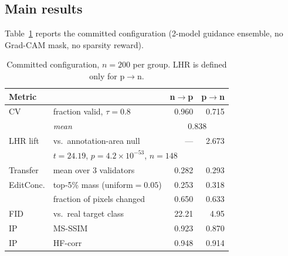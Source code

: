 \documentclass[10pt,twocolumn,letterpaper]{article}
\begin{document}
\subsection{Main results}
Table~\ref{tab:main} reports the committed configuration (2-model
guidance ensemble, no Grad-CAM mask, no sparsity reward).

\begin{table}[t]
\centering
\small
\caption{Committed configuration, $n=200$ per group. LHR is defined only
for p$\to$n.}
\label{tab:main}
\begin{tabular}{@{}llrr@{}}
\toprule
\textbf{Metric} & & \textbf{n$\to$p} & \textbf{p$\to$n} \\
\midrule
CV & fraction valid, $\tau{=}0.8$ & 0.960 & 0.715 \\
   & \emph{mean} & \multicolumn{2}{c}{0.838} \\
LHR lift & vs.\ annotation-area null & --- & 2.673 \\
   & \multicolumn{3}{l}{\footnotesize $t{=}24.19$, $p{=}4.2\times10^{-53}$, $n{=}148$} \\
Transfer & mean over 3 validators & 0.282 & 0.293 \\
EditConc. & top-5\% mass (uniform${=}0.05$) & 0.253 & 0.318 \\
   & fraction of pixels changed & 0.650 & 0.633 \\
FID & vs.\ real target class & 22.21 & 4.95 \\
IP & MS-SSIM & 0.923 & 0.870 \\
IP & HF-corr & 0.948 & 0.914 \\
\bottomrule
\end{tabular}
\end{table}

\begin{table}[t]
\centering
\small
\caption{Held-out transfer ratio, single- vs.\ ensemble-guided trained
policies, $n=200$ per group. Values below $0.15$ are in the adversarial
regime.}
\label{tab:transfer}
\end{table}
\end{document}
